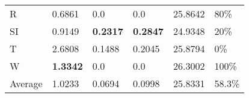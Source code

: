\documentclass[11pt, a4paper]{article}
\begin{document}
\begin{table}[H]
\begin{tabular}{llllll}
R                                & 0.6861                            & 0.0                               & 0.0                                  & 25.8642                                     & 80\%                              \\
SI                        & 0.9149                            & \textbf{0.2317}                   & \textbf{0.2847}                      & 24.9348                                     & 20\%                              \\
T                              & 2.6808                            & 0.1488                            & 0.2045                               & 25.8794                                     & 0\%                               \\
W                             & \textbf{1.3342}                   & 0.0                               & 0.0                                  & 26.3002                                     & 100\%                             \\ \hline
Average                               & 1.0233                            & 0.0694                            & 0.0998                               & 25.8331                                     & 58.3\%
\end{tabular}
\end{table}
\end{document}
